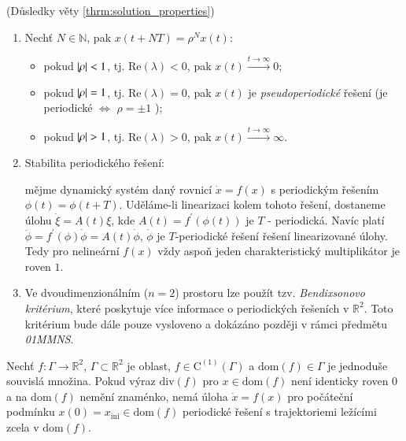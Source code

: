 \begin{remark}
	(Důsledky věty \ref{thrm:solution_properties})
	\begin{enumerate}
		\item Nechť $N \in \mathbb{N}$, pak $x(t+NT) = \rho^{N} x(t)$:
		
		\begin{itemize}
			\item pokud $\left|\rho\right| < 1$, tj. $\mathrm{Re} (\lambda )< 0$, pak $x(t) \xrightarrow{t \rightarrow \infty} 0$;
			
			\item pokud $\left|\rho\right| = 1$, tj. $\mathrm{Re} (\lambda) = 0$, pak $x(t)$ je \textit{pseudoperiodické} řešení (je periodické $\iff$ $\rho = \pm 1$ );
			
			\item pokud $\left|\rho\right| > 1$, tj. $\mathrm{Re} (\lambda) > 0$, pak $x(t) \xrightarrow{t \rightarrow \infty} \infty$.
		\end{itemize}
	
		\item Stabilita periodického řešení:
		
		mějme dynamický systém daný rovnicí $\dot{x} = f(x)$ s periodickým řešením $\phi(t) = \phi(t+T)$. Uděláme-li linearizaci kolem tohoto řešení, dostaneme úlohu $\dot{\xi} = A(t) \xi$, kde $A(t) = f^{\prime} (\phi(t))$ je $T$ - periodická. Navíc platí $\ddot{\phi} = f^{\prime}(\phi) \dot{\phi} = A(t) \dot{\phi}$, $\dot{\phi}$ je $T$-periodické řešení řešení linearizované úlohy. Tedy pro nelineární $f(x)$ vždy aspoň jeden charakteristický multiplikátor je roven $1$.
		
		\item Ve dvoudimenzionálním ($n = 2$) prostoru lze použít tzv. \textit{Bendixsonovo kritérium}, které poskytuje více informace o periodických řešeních v $\mathbb{R}^{2}$. Toto kritérium bude dále pouze vysloveno a dokázáno později v rámci předmětu \textit{01MMNS}.
	\end{enumerate}
\end{remark}

\medskip

\begin{thrm}\label{thrm:bendixson}
	Nechť $f: \Gamma \rightarrow \mathbb{R}^{2}$, $\Gamma \subset \mathbb{R}^{2}$ je oblast, $f \in \mathrm{C}^{(1)}(\Gamma)$ a $\mathrm{dom}(f) \in \Gamma$ je jednoduše souvislá množina. Pokud výraz $\mathrm{div}(f)$ pro $x \in \mathrm{dom}(f)$ není identicky roven $0$ a na  $\mathrm{dom}(f)$ nemění znaménko, nemá úloha $\dot{x} = f(x)$ pro počáteční podmínku $x(0) = x_{\mathrm{ini}} \in \mathrm{dom}(f)$ periodické řešení s trajektoriemi ležícími zcela v $\mathrm{dom}(f)$.
\end{thrm}

